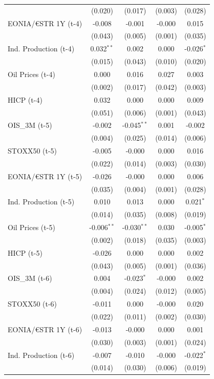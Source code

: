 \begin{longtable}[t]{lcccc}
 & (0.020) & (0.017) & (0.003) & (0.028)\\
EONIA/€STR 1Y (t-4) & -0.008 & -0.001 & -0.000 & 0.015\\
 & (0.043) & (0.005) & (0.001) & (0.035)\\
Ind. Production (t-4) & 0.032$^{**}$ & 0.002 & 0.000 & -0.026$^{*}$\\
 & (0.015) & (0.043) & (0.010) & (0.020)\\
Oil Prices (t-4) & 0.000 & 0.016 & 0.027 & 0.003\\
 & (0.002) & (0.017) & (0.042) & (0.003)\\
HICP (t-4) & 0.032 & 0.000 & 0.000 & 0.009\\
 & (0.051) & (0.006) & (0.001) & (0.043)\\
OIS\_3M (t-5) & -0.002 & -0.045$^{**}$ & 0.001 & -0.002\\
 & (0.004) & (0.025) & (0.014) & (0.006)\\
STOXX50 (t-5) & -0.005 & -0.000 & 0.000 & 0.016\\
 & (0.022) & (0.014) & (0.003) & (0.030)\\
EONIA/€STR 1Y (t-5) & -0.026 & -0.000 & 0.000 & 0.006\\
 & (0.035) & (0.004) & (0.001) & (0.028)\\
Ind. Production (t-5) & 0.010 & 0.013 & 0.000 & 0.021$^{*}$\\
 & (0.014) & (0.035) & (0.008) & (0.019)\\
Oil Prices (t-5) & -0.006$^{**}$ & -0.030$^{**}$ & 0.030 & -0.005$^{*}$\\
 & (0.002) & (0.018) & (0.035) & (0.003)\\
HICP (t-5) & -0.026 & 0.000 & 0.000 & 0.002\\
 & (0.043) & (0.005) & (0.001) & (0.036)\\
OIS\_3M (t-6) & 0.004 & -0.023$^{*}$ & -0.000 & 0.002\\
 & (0.004) & (0.024) & (0.012) & (0.005)\\
STOXX50 (t-6) & -0.011 & 0.000 & -0.000 & 0.020\\
 & (0.022) & (0.011) & (0.002) & (0.030)\\
EONIA/€STR 1Y (t-6) & -0.013 & -0.000 & 0.000 & 0.001\\
 & (0.030) & (0.003) & (0.001) & (0.024)\\
Ind. Production (t-6) & -0.007 & -0.010 & -0.000 & -0.022$^{*}$\\
 & (0.014) & (0.030) & (0.006) & (0.019)\\

\end{longtable}
